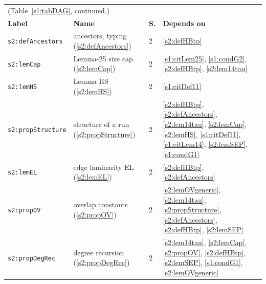 \begin{center}
{\footnotesize
\setlength{\tabcolsep}{3pt}
\begin{tabular}{p{3.2cm}p{3.6cm}p{0.5cm}p{7.6cm}}
\multicolumn{4}{l}{(Table~\ref{s1:tabDAG}, continued.)}\\
\textbf{Label} & \textbf{Name} & \textbf{S.} & \textbf{Depends on}\\
\hline
\texttt{s2:defAncestors} & ancestors, typing (\ref{s2:defAncestors}) & 2 & \ref{s2:defHBtp}\\
\texttt{s2:lemCap} & Lemma-25 size cap (\ref{s2:lemCap}) & 2 & \ref{s1:citLem25}, \ref{s1:condG2}, \ref{s2:defHBtp}, \ref{s2:lem14tau}\\
\texttt{s2:lemHS} & Lemma HS (\ref{s2:lemHS}) & 2 & \ref{s1:citDef11}\\
\texttt{s2:propStructure} & structure of a run (\ref{s2:propStructure}) & 2 & \ref{s2:defHBtp}, \ref{s2:defAncestors}, \ref{s2:lem14tau}, \ref{s2:lemCap}, \ref{s2:lemHS}, \ref{s1:citDef11}, \ref{s1:citLem14}, \ref{s2:lemSEP}, \ref{s1:condG1}\\
\texttt{s2:lemEL} & edge laminarity EL (\ref{s2:lemEL}) & 2 & \ref{s2:defHBtp}, \ref{s2:defAncestors}\\
\texttt{s2:propOV} & overlap constants (\ref{s2:propOV}) & 2 & \ref{s2:lemOVgeneric}, \ref{s2:lem14tau}, \ref{s2:propStructure}, \ref{s2:defAncestors}, \ref{s2:defHBtp}, \ref{s2:lemSEP}\\
\texttt{s2:propDegRec} & degree recursion (\ref{s2:propDegRec}) & 2 & \ref{s2:lem14tau}, \ref{s2:lemCap}, \ref{s2:propOV}, \ref{s2:defHBtp}, \ref{s2:lemSEP}, \ref{s1:condG1}, \ref{s2:lemOVgeneric}\\
\hline
\end{tabular}}
\end{center}

